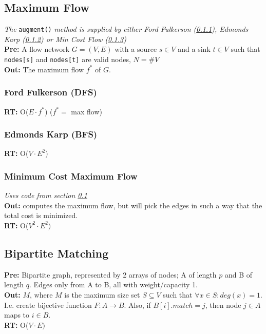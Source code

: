 \documentclass[a4paper,10pt]{article}
\begin{document}
\begin{multicols}{2}
\subsection{Maximum Flow}\label{sec:maxflow}
\textit{The} \lstinline|augment()| \textit{method is supplied by either Ford Fulkerson (\ref{alg:ford-fulkerson}), Edmonds Karp (\ref{alg:edmonds-karp}) or Min Cost Flow (\ref{sec:mincostflow})}\\
\textbf{Pre:} A flow network $G=(V,E)$ with a source $s\in V$ and a sink $t\in V$ such that \lstinline|nodes[s]| and \lstinline|nodes[t]| are valid nodes, $N=\#V$\\
\textbf{Out:} The maximum flow $f^*$ of $G$.


\subsubsection{Ford Fulkerson (DFS)}\label{alg:ford-fulkerson}
\textbf{RT:} O($E\cdot f^*$) ($f^*=$ max flow)


\subsubsection{Edmonds Karp (BFS)}\label{alg:edmonds-karp}
\textbf{RT:} O($V\cdot E^2$)


\subsubsection{Minimum Cost Maximum Flow}\label{sec:mincostflow}
\textit{Uses code from section \ref{sec:maxflow}}\\
\textbf{Out:} computes the maximum flow, but will pick the edges in such a way that the total cost is minimized.\\
\textbf{RT:} O($V^2\cdot E^2)$


\subsection{Bipartite Matching}\label{sec:bipartite_matching}
\textbf{Pre:} Bipartite graph, represented by 2 arrays of nodes; A of length $p$ and B of length $q$. Edges only from A to B, all with weight/capacity 1.\\
\textbf{Out:} $M$, where $M$ is the maximum size set $S\subseteq V$ such that $\forall x\in S : deg(x) = 1$. I.e. create bijective function $F : A \rightarrow B$. Also, if $B[i].match = j$, then node $j\in A$ maps to $i\in B$.\\
\textbf{RT:} O($V\cdot E)$


\end{multicols}
\end{document}
